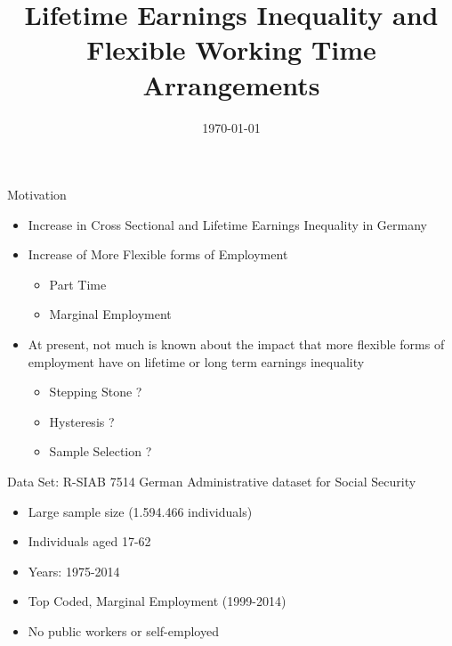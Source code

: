 \documentclass{beamer}
\title{Lifetime Earnings Inequality and Flexible Working Time Arrangements}
\author[Short Name (U ABC)]{%
  \texorpdfstring{%
    \begin{columns}
      \column{.5\linewidth}
      \centering
Manuel Sanchez
    \end{columns}
 }
{Author 1}
}
\institute{University of Bristol}
\date{\today}
\begin{document}
\begin{frame}
  \titlepage
\end{frame}


\begin{frame}{Motivation}
\begin{itemize}
\item Increase in Cross Sectional and Lifetime Earnings Inequality in Germany
\vfill
\item Increase of More Flexible forms of Employment
\vfill
\begin{itemize}
\item Part Time
\vfill
\item Marginal Employment
\end{itemize}
\vfill
\item At present, not much is known about the impact that more flexible forms of employment have on lifetime or long term earnings inequality
\vfill
\begin{itemize}
\item Stepping Stone ?
\vfill
\item Hysteresis ?
\vfill
\item Sample Selection ?
\end{itemize}
\end{itemize}
\end{frame}

\begin{frame}{Data Set: R-SIAB 7514}
German Administrative dataset for Social Security\\

\vfill
\begin{itemize}
\vfill
\item Large sample size (1.594.466 individuals)
\vfill
\item Individuals aged 17-62
\vfill
\item Years: 1975-2014
\vfill
\item Top Coded, Marginal Employment (1999-2014)
\vfill
\item No public workers or self-employed
\end{itemize}
\end{frame}
\end{document}
